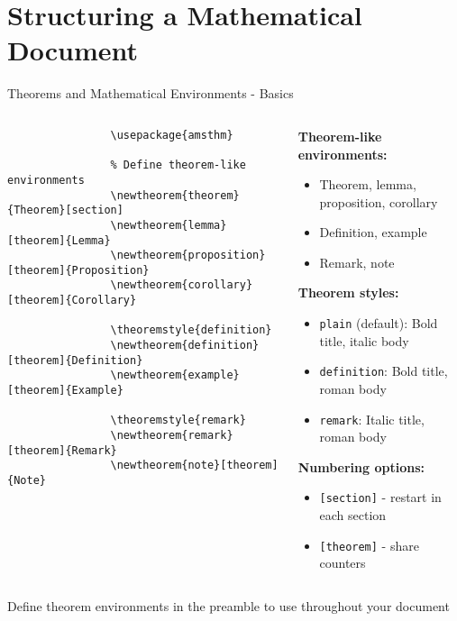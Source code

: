 
\section{Structuring a Mathematical Document}

\begin{frame}[fragile]{Theorems and Mathematical Environments - Basics}
	\begin{columns}
		\begin{column}{0.5\textwidth}
			\begin{lstlisting}[basicstyle=\footnotesize\ttfamily]
				% In preamble
				\usepackage{amsthm}
				
				% Define theorem-like environments
				\newtheorem{theorem}{Theorem}[section]
				\newtheorem{lemma}[theorem]{Lemma}
				\newtheorem{proposition}[theorem]{Proposition}
				\newtheorem{corollary}[theorem]{Corollary}
				
				\theoremstyle{definition}
				\newtheorem{definition}[theorem]{Definition}
				\newtheorem{example}[theorem]{Example}
				
				\theoremstyle{remark}
				\newtheorem{remark}[theorem]{Remark}
				\newtheorem{note}[theorem]{Note}
			\end{lstlisting}
		\end{column}
		
		\begin{column}{0.5\textwidth}
			\textbf{Theorem-like environments:}
			\begin{itemize}
				\item Theorem, lemma, proposition, corollary
				\item Definition, example
				\item Remark, note
			\end{itemize}
			
			\textbf{Theorem styles:}
			\begin{itemize}
				\item \texttt{plain} (default): Bold title, italic body
				\item \texttt{definition}: Bold title, roman body
				\item \texttt{remark}: Italic title, roman body
			\end{itemize}
			
			\textbf{Numbering options:}
			\begin{itemize}
				\item \texttt{[section]} - restart in each section
				\item \texttt{[theorem]} - share counters
			\end{itemize}
		\end{column}
	\end{columns}
	
	\begin{tip}
		Define theorem environments in the preamble to use throughout your document
	\end{tip}
\end{frame}

